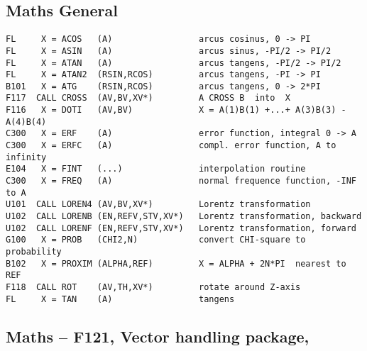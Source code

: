 \subsection*{Maths General}

\begin{verbatim}
FL     X = ACOS   (A)                 arcus cosinus, 0 -> PI
FL     X = ASIN   (A)                 arcus sinus, -PI/2 -> PI/2
FL     X = ATAN   (A)                 arcus tangens, -PI/2 -> PI/2
FL     X = ATAN2  (RSIN,RCOS)         arcus tangens, -PI -> PI
B101   X = ATG    (RSIN,RCOS)         arcus tangens, 0 -> 2*PI
F117  CALL CROSS  (AV,BV,XV*)         A CROSS B  into  X
F116   X = DOTI   (AV,BV)             X = A(1)B(1) +...+ A(3)B(3) - A(4)B(4)
C300   X = ERF    (A)                 error function, integral 0 -> A
C300   X = ERFC   (A)                 compl. error function, A to infinity
E104   X = FINT   (...)               interpolation routine
C300   X = FREQ   (A)                 normal frequence function, -INF to A
U101  CALL LOREN4 (AV,BV,XV*)         Lorentz transformation
U102  CALL LORENB (EN,REFV,STV,XV*)   Lorentz transformation, backward
U102  CALL LORENF (EN,REFV,STV,XV*)   Lorentz transformation, forward
G100   X = PROB   (CHI2,N)            convert CHI-square to probability
B102   X = PROXIM (ALPHA,REF)         X = ALPHA + 2N*PI  nearest to REF
F118  CALL ROT    (AV,TH,XV*)         rotate around Z-axis
FL     X = TAN    (A)                 tangens
\end{verbatim}

\subsection*{Maths -- F121, Vector handling package, }

